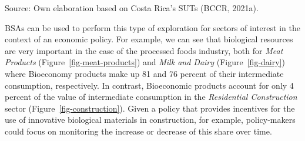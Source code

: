 \documentclass[
  letterpaper,
  DIV=11,
  numbers=noendperiod]{scrartcl}
\begin{document}
Source: Own elaboration based on Costa Rica's SUTs (BCCR, 2021a).

BSAs can be used to perform this type of exploration for sectors of
interest in the context of an economic policy. For example, we can see
that biological resources are very important in the case of the
processed foods industry, both for \emph{Meat Products}
(Figure~\ref{fig-meat-products}) and \emph{Milk and Dairy}
(Figure~\ref{fig-dairy}) where Bioeconomy products make up 81 and 76
percent of their intermediate consumption, respectively. In contrast,
Bioeconomic products account for only 4 percent of the value of
intermediate consumption in the \emph{Residential Construction} sector
(Figure~\ref{fig-construction}). Given a policy that provides incentives
for the use of innovative biological materials in construction, for
example, policy-makers could focus on monitoring the increase or
decrease of this share over time.
\end{document}

